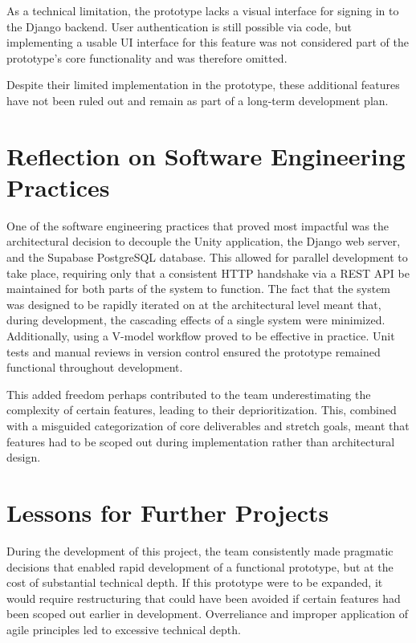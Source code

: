 As a technical limitation, the prototype lacks a visual interface for signing in to the Django backend. User authentication is still possible via code, but implementing a usable UI interface for this feature was not considered part of the prototype's core functionality and was therefore omitted.

Despite their limited implementation in the prototype, these additional features have not been ruled out and remain as part of a long-term development plan.

\section{Reflection on Software Engineering Practices}
\label{sec:reflection-on-software-engineering-practices}

One of the software engineering practices that proved most impactful was the architectural decision to decouple the Unity application, the Django web server, and the Supabase PostgreSQL database. This allowed for parallel development to take place, requiring only that a consistent HTTP handshake via a REST API be maintained for both parts of the system to function. The fact that the system was designed to be rapidly iterated on at the architectural level meant that, during development, the cascading effects of a single system were minimized. Additionally, using a V-model workflow proved to be effective in practice. Unit tests and manual reviews in version control ensured the prototype remained functional throughout development.

This added freedom perhaps contributed to the team underestimating the complexity of certain features, leading to their deprioritization. This, combined with a misguided categorization of core deliverables and stretch goals, meant that features had to be scoped out during implementation rather than architectural design.

\section{Lessons for Further Projects}
\label{sec:lessons-for-further-projects}

During the development of this project, the team consistently made pragmatic decisions that enabled rapid development of a functional prototype, but at the cost of substantial technical depth. If this prototype were to be expanded, it would require restructuring that could have been avoided if certain features had been scoped out earlier in development. Overreliance and improper application of agile principles led to excessive technical depth.
